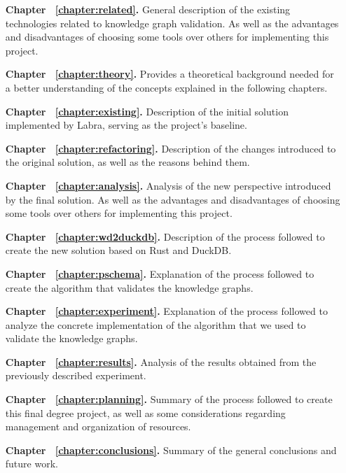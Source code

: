 \begin{itemize}
    \itemsep0.25em
    \item[\textbf{Chapter ~\ref{chapter:related}.}] General description of the existing technologies related to knowledge graph validation. As well as the advantages and disadvantages of choosing some tools over others for implementing this project.
    \item[\textbf{Chapter ~\ref{chapter:theory}.}] Provides a theoretical background needed for a better understanding of the concepts explained in the following chapters.
    \item[\textbf{Chapter ~\ref{chapter:existing}.}] Description of the initial solution implemented by Labra, serving as the project's baseline.
    \item[\textbf{Chapter ~\ref{chapter:refactoring}.}] Description of the changes introduced to the original solution, as well as the reasons behind them.
    \item[\textbf{Chapter ~\ref{chapter:analysis}.}] Analysis of the new perspective introduced by the final solution. As well as the advantages and disadvantages of choosing some tools over others for implementing this project.
    \item[\textbf{Chapter ~\ref{chapter:wd2duckdb}.}] Description of the process followed to create the new solution based on Rust and DuckDB.
    \item[\textbf{Chapter ~\ref{chapter:pschema}.}] Explanation of the process followed to create the algorithm that validates the knowledge graphs.
    \item[\textbf{Chapter ~\ref{chapter:experiment}.}] Explanation of the process followed to analyze the concrete implementation of the algorithm that we used to validate the knowledge graphs.
    \item[\textbf{Chapter ~\ref{chapter:results}.}] Analysis of the results obtained from the previously described experiment.
    \item[\textbf{Chapter ~\ref{chapter:planning}.}] Summary of the process followed to create this final degree project, as well as some considerations regarding management and organization of resources.
    \item[\textbf{Chapter ~\ref{chapter:conclusions}.}] Summary of the general conclusions and future work.
\end{itemize}